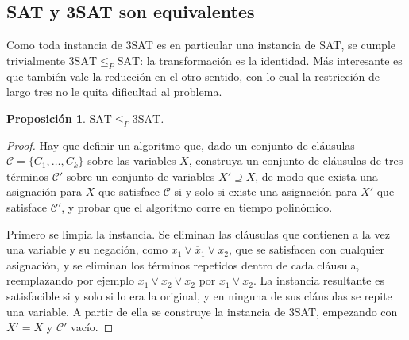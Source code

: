 \documentclass[12pt, spanish, oneside, openany]{book}
\newcommand{\redp}{\le_{P}}
\newcommand{\nega}[1]{\overline{#1}} %
\theoremstyle{uprightplain}
\newtheorem{proposicion}[teorema]{Proposición}
\theoremstyle{definition}
\theoremstyle{remark}
\theoremstyle{definition}
\begin{document}
\subsection{SAT y 3SAT son equivalentes}
\label{subsec:np-sat-3sat}

Como toda instancia de 3SAT es en particular una instancia de SAT, se cumple trivialmente $3\mathrm{SAT}\redp\mathrm{SAT}$: la transformación es la identidad. Más interesante es que también vale la reducción en el otro sentido, con lo cual la restricción de largo tres no le quita dificultad al problema.

\begin{proposicion}
\label{prop:np-sat-3sat}
$\mathrm{SAT}\redp 3\mathrm{SAT}$.
\end{proposicion}
\begin{proof}
Hay que definir un algoritmo que, dado un conjunto de cláusulas $\mathcal{C}=\{C_1,\dots,C_k\}$ sobre las variables $X$, construya un conjunto de cláusulas de tres términos $\mathcal{C}'$ sobre un conjunto de variables $X'\supseteq X$, de modo que exista una asignación para $X$ que satisface $\mathcal{C}$ si y solo si existe una asignación para $X'$ que satisface $\mathcal{C}'$, y probar que el algoritmo corre en tiempo polinómico.

Primero se limpia la instancia. Se eliminan las cláusulas que contienen a la vez una variable y su negación, como $x_1\vee\nega{x}_1\vee x_2$, que se satisfacen con cualquier asignación, y se eliminan los términos repetidos dentro de cada cláusula, reemplazando por ejemplo $x_1\vee x_2\vee x_2$ por $x_1\vee x_2$. La instancia resultante es satisfacible si y solo si lo era la original, y en ninguna de sus cláusulas se repite una variable. A partir de ella se construye la instancia de 3SAT, empezando con $X'=X$ y $\mathcal{C}'$ vacío.


\end{proof}
\end{document}
